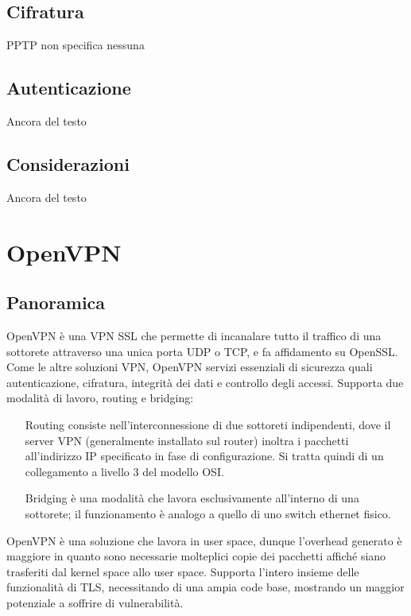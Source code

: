 \subsection{Cifratura}
PPTP non specifica nessuna

\subsection{Autenticazione}
Ancora del testo

\subsection{Considerazioni}
Ancora del testo

\section{OpenVPN}
\subsection{Panoramica}
OpenVPN è una VPN SSL che permette di incanalare tutto il traffico di una sottorete attraverso una unica porta UDP o TCP, e fa affidamento su OpenSSL. Come le altre soluzioni VPN, OpenVPN servizi essenziali di sicurezza quali autenticazione, cifratura, integrità dei dati e controllo degli accessi.
Supporta due modalità di lavoro, routing e bridging:
\begin{itemize}
    \item[Routing] consiste nell'interconnessione di due sottoreti indipendenti, dove il server VPN (generalmente installato sul router) inoltra i pacchetti all'indirizzo IP specificato in fase di configurazione. Si tratta quindi di un collegamento a livello 3 del modello OSI.
    \item[Bridging] è una modalità che lavora esclusivamente all'interno di una sottorete; il funzionamento è analogo a quello di uno switch ethernet fisico.
\end{itemize}

OpenVPN è una soluzione che lavora in user space, dunque l'overhead generato è maggiore in quanto sono necessarie molteplici copie dei pacchetti affiché siano trasferiti dal kernel space allo user space. Supporta l'intero insieme delle funzionalità di TLS, necessitando di una ampia code base, mostrando un maggior potenziale a soffrire di vulnerabilità.

